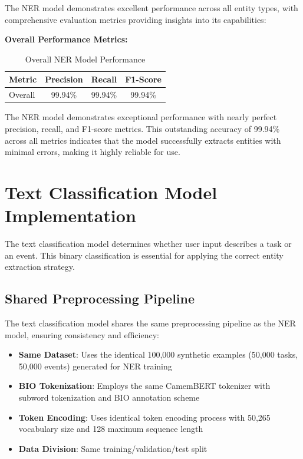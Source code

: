 \documentclass[12pt,a4paper]{article}
\begin{document}
The NER model demonstrates excellent performance across all entity types, with comprehensive evaluation metrics providing insights into its capabilities:

\textbf{Overall Performance Metrics:}
\begin{table}[H]
\centering
\begin{tabular}{|l|c|c|c|}
\hline
\textbf{Metric} & \textbf{Precision} & \textbf{Recall} & \textbf{F1-Score} \\
\hline
Overall & 99.94\% & 99.94\% & 99.94\% \\
\hline
\end{tabular}
\caption{Overall NER Model Performance}
\end{table}

The NER model demonstrates exceptional performance with nearly perfect precision, recall, and F1-score metrics. This outstanding accuracy of 99.94\% across all metrics indicates that the model successfully extracts entities with minimal errors, making it highly reliable for use.



\section{Text Classification Model Implementation}

The text classification model determines whether user input describes a task or an event. This binary classification is essential for applying the correct entity extraction strategy.

\subsection{Shared Preprocessing Pipeline}

The text classification model shares the same preprocessing pipeline as the NER model, ensuring consistency and efficiency:

\begin{itemize}
    \item \textbf{Same Dataset}: Uses the identical 100,000 synthetic examples (50,000 tasks, 50,000 events) generated for NER training
    \item \textbf{BIO Tokenization}: Employs the same CamemBERT tokenizer with subword tokenization and BIO annotation scheme
    \item \textbf{Token Encoding}: Uses identical token encoding process with 50,265 vocabulary size and 128 maximum sequence length
    \item \textbf{Data Division}: Same training/validation/test split
\end{itemize}
\end{document}
